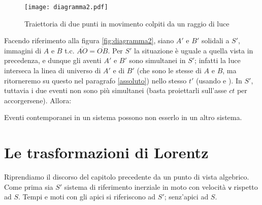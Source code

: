 \begin{figure}[htbp]
  \begin{center}
      
      
      
    \texttt{[image: diagramma2.pdf]}
    \caption{Traiettoria di due punti in movimento colpiti da un
      raggio di luce} \label{fig:diagramma2}
  \end{center}
\end{figure}
Facendo riferimento alla figura \vref{fig:diagramma2}, siano $A'$ e $
B' $ solidali a $ S' $, immagini di $A$ e $B$ t.c. $ \overline{ AO } =
\overline{ OB } $.  Per $ S' $ la situazione \`e uguale a quella vista
in precedenza, e dunque gli aventi $ A' $ e $ B' $ sono simultanei in
$ S' $; infatti la luce interseca la linea di universo di $ A' $ e di
$ B' $ (che sono le stesse di $ A $ e $ B $, ma ritorneremo su questo
nel paragrafo \vref{assoluto}) nello stesso $ t' $ (usando 
e ). In $ S' $, tuttavia i due eventi non sono pi\`u
simultanei (basta proiettarli sull'asse $ ct $ per
accorgersene). Allora:
\begin{osservazione}
  Eventi contemporanei in un sistema possono non esserlo in un altro
  sistema.
\end{osservazione}
\section{Le trasformazioni di Lorentz}
Riprendiamo il discorso del capitolo precedente da un punto di vista
algebrico. Come prima sia $S'$ sistema di riferimento inerziale in
moto con velocit\`a $\mathbf{\mathsf{v}}$ rispetto ad $S$. Tempi e
moti con gli apici si riferiscono ad $S'$; senz'apici ad $S$.

